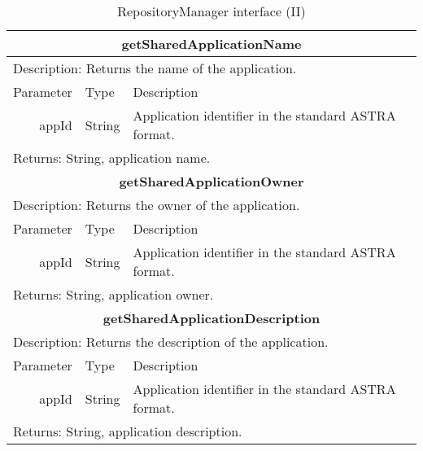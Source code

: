 \begin{table}[h!]
\begin{center}
\begin{tabular}{||r|l|l||}
		\hline \hline
		\multicolumn{3}{||c||}{\bfseries{getSharedApplicationName}} \\
		\hline
		\hline 
		\multicolumn{3}{||l||}{Description: Returns the name of the application.} \\
		\hline \hline Parameter & Type & Description \\ 
		\hline \hline
			appId & String & Application identifier in the standard ASTRA format. \\
		\hline \hline
		\multicolumn{3}{||l||}{Returns: String, application name.} \\
		\hline \hline
	
		\hline \hline
		\multicolumn{3}{||c||}{\bfseries{getSharedApplicationOwner}} \\
		\hline
		\hline 
		\multicolumn{3}{||l||}{Description: Returns the owner of the application.} \\
		\hline \hline Parameter & Type & Description \\ 
		\hline \hline
			appId & String & Application identifier in the standard ASTRA format. \\
		\hline \hline
		\multicolumn{3}{||l||}{Returns: String, application owner.} \\
		\hline \hline
		
		\hline \hline
		\multicolumn{3}{||c||}{\bfseries{getSharedApplicationDescription}} \\
		\hline
		\hline 
		\multicolumn{3}{||l||}{Description: Returns the description of the
		application.} \\ \hline \hline Parameter & Type & Description \\ 
		\hline \hline
			appId & String & Application identifier in the standard ASTRA format. \\
		\hline \hline
		\multicolumn{3}{||l||}{Returns: String, application description.} \\
		\hline \hline
		
		
		\end{tabular}
		\caption{\label{table:rm-interface-2} RepositoryManager interface (II)}
	\end{center}
\end{table}

